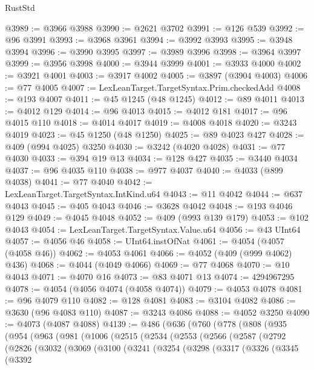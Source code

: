 \begin{lexlean}{RustStd}
\begin{coremodule}
{\begin{coremodule}
{{{{{{{{{{{{{{{{{{{{{{{{{{{{{{{{{{{{{{{{{{{{{{{{{{{{{{{{{{{{@3989 := @3966 @3988
@3990 := @2621 @3702
@3991 := @126 @539
@3992 := @96 @3991
@3993 := @3968 @3961
@3994 := @3992 @3993
@3995 := @3948 @3994
@3996 := @3990 @3995
@3997 := @3989 @3996
@3998 := @3964 @3997
@3999 := @3956 @3998
@4000 := @3944 @3999
@4001 := @3933 @4000
@4002 := @3921 @4001
@4003 := @3917 @4002
@4005 := @3897 (@3904 @4003)
@4006 := @77 @4005
@4007 := LexLeanTarget.TargetSyntax.Prim.checkedAdd
@4008 := @193 @4007
@4011 := @45 @1245 (@48 @1245)
@4012 := @89 @4011
@4013 := @4012 @129
@4014 := @96 @4013
@4015 := @4012 @181
@4017 := @96 @4015 @110
@4018 := @4014 @4017
@4019 := @4008 @4018
@4020 := @3243 @4019
@4023 := @45 @1250 (@48 @1250)
@4025 := @89 @4023 @427
@4028 := @409 (@994 @4025) @3250
@4030 := @3242 (@4020 @4028)
@4031 := @77 @4030
@4033 := @394 @19 @13
@4034 := @128 @427
@4035 := @3440 @4034
@4037 := @96 @4035 @110
@4038 := @977 @4037
@4040 := @4033 (@899 @4038)
@4041 := @77 @4040
@4042 := LexLeanTarget.TargetSyntax.IntKind.u64
@4043 := @11 @4042
@4044 := @637 @4043
@4045 := @405 @4043
@4046 := @3628 @4042
@4048 := @193 @4046 @129
@4049 := @4045 @4048
@4052 := @409 (@993 @139 @179)
@4053 := @102 @4043
@4054 := LexLeanTarget.TargetSyntax.Value.u64
@4056 := @43 UInt64
@4057 := @4056 @46
@4058 := UInt64.instOfNat
@4061 := @4054 (@4057 (@4058 @46))
@4062 := @4053 @4061
@4066 := @4052 (@409 (@999 @4062) @436)
@4068 := @4044 (@4049 @4066)
@4069 := @77 @4068
@4070 := @10 @4043
@4071 := @4070 @16
@4073 := @83 @4071 @13
@4074 := 4294967295
@4078 := @4054 (@4056 @4074 (@4058 @4074))
@4079 := @4053 @4078
@4081 := @96 @4079 @110
@4082 := @128 @4081
@4083 := @3104 @4082
@4086 := @3630 (@96 @4083 @110)
@4087 := @3243 @4086
@4088 := @4052 @3250
@4090 := @4073 (@4087 @4088)
@4139 := @486
    (@636
      (@760
        (@778
          (@808
            (@935
              (@954
                (@963
                  (@981
                    (@1006
                      (@2515
                        (@2534
                          (@2553
                            (@2566
                              (@2587
                                (@2792
                                  (@2826
                                    (@3032
                                      (@3069
                                        (@3100
                                          (@3241
                                            (@3254
                                              (@3298
                                                (@3317
                                                  (@3326
                                                    (@3345
                                                      (@3392
}}}}}}}}}}}}}}}}}}}}}}}}}}}}}}}}}}}}}}}}}}}}}}}}}}}}}}}}}}}}
\end{coremodule}}
\end{coremodule}
\end{lexlean}
